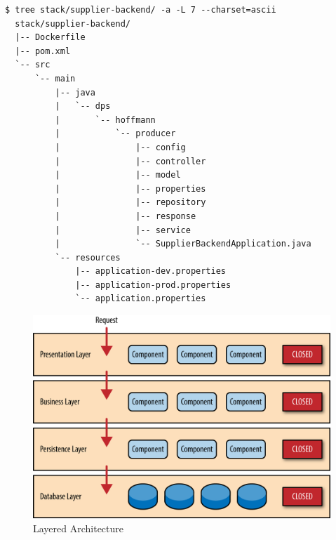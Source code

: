 \label{verb:supplierStruct}
\begin{lstlisting}[caption={Supplier Backend - Struktur},style=bashStyle]
  $ tree stack/supplier-backend/ -a -L 7 --charset=ascii
  stack/supplier-backend/
  |-- Dockerfile
  |-- pom.xml
  `-- src
      `-- main
          |-- java
          |   `-- dps
          |       `-- hoffmann
          |           `-- producer
          |               |-- config
          |               |-- controller
          |               |-- model
          |               |-- properties
          |               |-- repository
          |               |-- response
          |               |-- service
          |               `-- SupplierBackendApplication.java
          `-- resources
              |-- application-dev.properties
              |-- application-prod.properties
              `-- application.properties
\end{lstlisting}


\begin{figure}[ht!]
	\centering
	\includegraphics[width=.7\linewidth]{kapitel/problemloesung/implementierung/_img/dataflow-overview-01}
	\caption[Layered Architecture]{Layered Architecture \cite{oreilly-layered-arch}}
	\label{fig:layeredArchitecture}
\end{figure}


